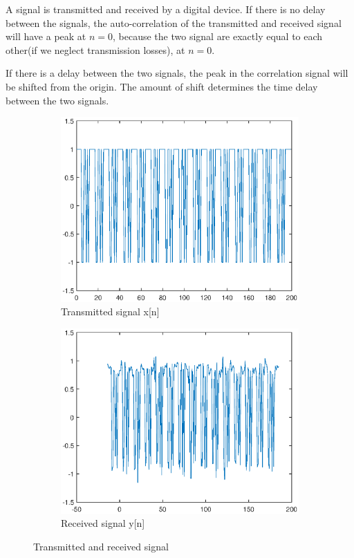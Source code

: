\documentclass[a4paper,11pt]{article}
\begin{document}
	A signal is transmitted and received by a digital device. If there is no delay between the signals, the auto-correlation of the transmitted and received signal will have a peak at $n=0$, because the two signal are exactly equal to each other(if we neglect transmission losses), at $n=0$.
	
	If there is a delay between the two signals, the peak in the correlation signal will be shifted from the origin. The amount of shift determines the time delay between the two signals.
	
	\begin{figure}[h!]
		\centering
		\begin{subfigure}[h]{0.4\linewidth}
			\includegraphics[width=\linewidth]{transmit.eps}
			\caption{Transmitted signal x[n]}
			\label{fig:transmitted_signal}
		\end{subfigure}
		\begin{subfigure}[h]{0.4\linewidth}
			\includegraphics[width=\linewidth]{receive.eps}
			\caption{Received signal y[n]}
			\label{fig:received_signal}
		\end{subfigure}
		\caption{Transmitted and received signal}
	\end{figure}
\end{document}
